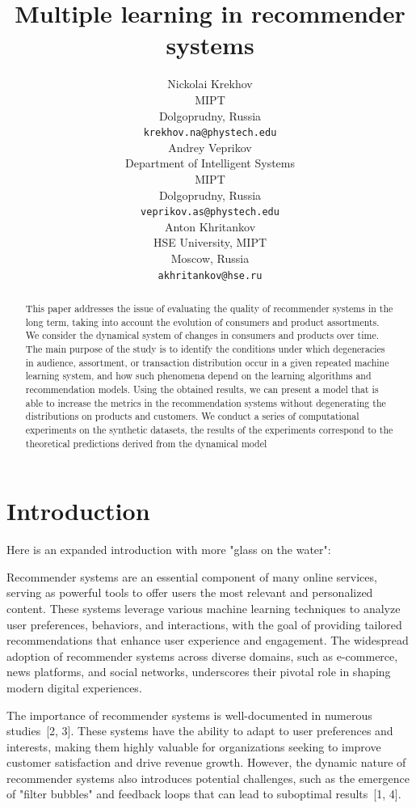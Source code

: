 \documentclass{article}
\title{Multiple learning in recommender systems}
\author{
	Nickolai Krekhov \\
	MIPT \\
        Dolgoprudny, Russia \\
        \texttt{krekhov.na@phystech.edu} \\
	\And
	Andrey Veprikov \\
	Department of Intelligent Systems
            \\MIPT\\Dolgoprudny, Russia\\\texttt{veprikov.as@phystech.edu}\\
	\And
	Anton Khritankov \\
        HSE University, MIPT\\
	Moscow, Russia\\
        \texttt{akhritankov@hse.ru}
}
\date{}
\begin{document}
\maketitle

\begin{abstract}
        This paper addresses the issue of evaluating the quality of recommender systems in the long term, taking into account the evolution of consumers and product assortments. We consider the dynamical system of changes in consumers and products over time. The main purpose of the study is to identify the conditions under which degeneracies in audience, assortment, or transaction distribution occur in a given repeated machine learning system, and how such phenomena depend on the learning algorithms and recommendation models. Using the obtained results, we can present a model that is able to increase the metrics in the recommendation systems without degenerating the distributions on products and customers. We conduct a series of computational experiments on the synthetic datasets, the results of the experiments correspond to the theoretical predictions derived from the dynamical model
\end{abstract}



\section{Introduction}
Here is an expanded introduction with more "glass on the water":

Recommender systems are an essential component of many online services, serving as powerful tools to offer users the most relevant and personalized content. These systems leverage various machine learning techniques to analyze user preferences, behaviors, and interactions, with the goal of providing tailored recommendations that enhance user experience and engagement. The widespread adoption of recommender systems across diverse domains, such as e-commerce, news platforms, and social networks, underscores their pivotal role in shaping modern digital experiences.

The importance of recommender systems is well-documented in numerous studies~[2, 3]. These systems have the ability to adapt to user preferences and interests, making them highly valuable for organizations seeking to improve customer satisfaction and drive revenue growth. However, the dynamic nature of recommender systems also introduces potential challenges, such as the emergence of "filter bubbles" and feedback loops that can lead to suboptimal results~[1, 4].
\end{document}
